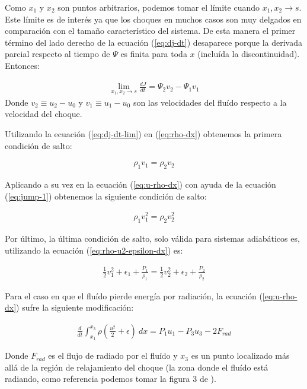 Como $x_1$ y $x_2$ son puntos arbitrarios, podemos tomar el límite cuando $x_1, x_2 \to s$. Este límite es de interés ya que los choques en muchos casos son muy delgados en comparación con el tamaño característico del sistema. De esta manera el primer término del lado derecho de la ecuación (\ref{eq:dj-dt}) desaparece porque la derivada parcial respecto al tiempo de $\Psi$ es finita para toda $x$ (incluída la discontinuidad). Entonces:

\begin{align}
  \lim_{x_1, x_2 \to s}\frac{dJ}{dt} = \Psi_2v_2 - \Psi_1v_1 \label{eq:dj-dt-lim}
\end{align}
Donde $v_2\equiv u_2 - u_0$ y $v_1 \equiv u_1-u_0$ son las velocidades del fluído respecto a la velocidad del choque.

Utilizando la ecuación (\ref{eq:dj-dt-lim}) en (\ref{eq:rho-dx}) obtenemos la primera condición de salto:

\begin{align}
  \rho_1v_1 = \rho_2v_2 \label{eq:jump-1}
\end{align}

Aplicando a su vez en la ecuación (\ref{eq:u-rho-dx}) con ayuda de la ecuación (\ref{eq:jump-1}) obtenemos la siguiente condición de salto:

\begin{align}
  \rho_1v^2_1 = \rho_2v^2_2 \label{eq:jump-2}
\end{align}

Por último, la última condición de salto, solo válida para sistemas adiabáticos es, utilizando la ecuación (\ref{eq:rho-u2-epsilon-dx}) es:

\begin{align}
  \frac{1}{2}v^2_1 + \epsilon_1 + \frac{P_1}{\rho_1} = \frac{1}{2}v^2_2 + \epsilon_2 + \frac{P_2}{\rho_2} \label{eq:jump-3}
\end{align}

Para el caso en que el fluído pierde energía por radiación, la ecuación (\ref{eq:u-rho-dx}) sufre la siguiente modificación:

\begin{align}
     \frac{d}{dt}\int^{x_3}_{x_1} \rho\left(\frac{u^2}{2} + \epsilon\right)~dx = P_1u_1 - P_3u_3 -2F_{rad}\label{eq:rho-u2-epsilon-dx-rad}
\end{align}

Donde $F_{rad}$ es el flujo de radiado por el fluído y $x_3$ es un punto localizado más allá de la región de relajamiento del choque (la zona donde el fluído está radiando, como referencia podemos tomar la figura 3 de \citet{Shull:1979}).

